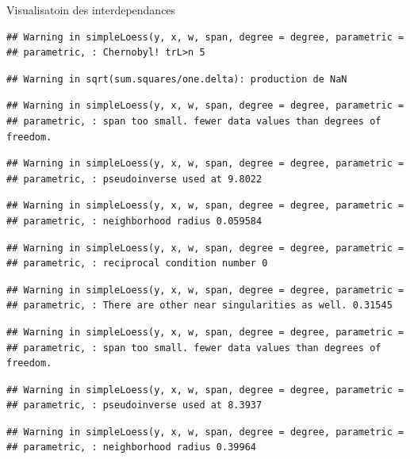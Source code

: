 \documentclass[11pt,ignorenonframetext,]{beamer}
\begin{document}
\begin{frame}[fragile]{Visualisatoin des interdependances}
\begin{verbatim}
## Warning in simpleLoess(y, x, w, span, degree = degree, parametric =
## parametric, : Chernobyl! trL>n 5
\end{verbatim}

\begin{verbatim}
## Warning in sqrt(sum.squares/one.delta): production de NaN
\end{verbatim}

\begin{verbatim}
## Warning in simpleLoess(y, x, w, span, degree = degree, parametric =
## parametric, : span too small. fewer data values than degrees of freedom.
\end{verbatim}

\begin{verbatim}
## Warning in simpleLoess(y, x, w, span, degree = degree, parametric =
## parametric, : pseudoinverse used at 9.8022
\end{verbatim}

\begin{verbatim}
## Warning in simpleLoess(y, x, w, span, degree = degree, parametric =
## parametric, : neighborhood radius 0.059584
\end{verbatim}

\begin{verbatim}
## Warning in simpleLoess(y, x, w, span, degree = degree, parametric =
## parametric, : reciprocal condition number 0
\end{verbatim}

\begin{verbatim}
## Warning in simpleLoess(y, x, w, span, degree = degree, parametric =
## parametric, : There are other near singularities as well. 0.31545
\end{verbatim}

\begin{verbatim}
## Warning in simpleLoess(y, x, w, span, degree = degree, parametric =
## parametric, : span too small. fewer data values than degrees of freedom.
\end{verbatim}

\begin{verbatim}
## Warning in simpleLoess(y, x, w, span, degree = degree, parametric =
## parametric, : pseudoinverse used at 8.3937
\end{verbatim}

\begin{verbatim}
## Warning in simpleLoess(y, x, w, span, degree = degree, parametric =
## parametric, : neighborhood radius 0.39964
\end{verbatim}


\end{frame}
\end{document}

